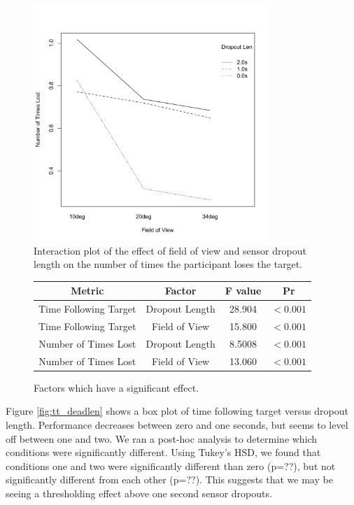 \documentclass{acmsiggraph}                     %
\begin{document}
\begin{figure}[t]
	\centering
	\includegraphics[width=3.5in]{figures/numtimes_interaction.pdf}
	\caption{\label{fig:interaction}Interaction plot of the effect of field of view and sensor dropout length on the number of times the participant loses the target.}
\end{figure}

\begin{figure}[h]
\centering
\begin{tabular}{|c|c|c|c|}
\hline
Metric & Factor & F value & Pr \\
\hline
Time Following Target & Dropout Length & 28.904 & $<0.001$\\
Time Following Target & Field of View & 15.800 & $<0.001$\\
Number of Times Lost & Dropout Length & 8.5008 & $<0.001$\\
Number of Times Lost & Field of View & 13.060 & $<0.001$\\
\hline
\end{tabular}
 \caption{\label{fig:anova}Factors which have a significant effect.}
\end{figure}

Figure \ref{fig:tt_deadlen} shows a box plot of time following target versus dropout length.  Performance decreases between zero and one seconds, but seems to level off between one and two.  We ran a post-hoc analysis to determine which conditions were significantly different.  Using Tukey's HSD, we found that conditions one and two were significantly different than zero (p=??), but not significantly different from each other (p=??).  This suggests that we may be seeing a thresholding effect above one second sensor dropouts.
\end{document}
